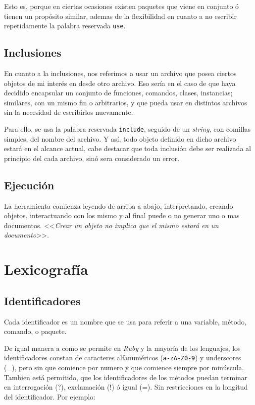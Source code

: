 \documentclass[12pt,letterpaper,titlepage,oneside,openright]{book}
\newcommand{\OhTeX}{%
    \makebox[0.76em][c]{O}%
    \makebox[0.25em][c]{%
        \raisebox{0.14em}[0em][0em]{%
            \fontsize{0.5em}{0cm}%
                \selectfont H%
        }%
    }%
    \makebox[1.35em][c]{\TeX}%
}
\newcommand{\ohtex}{\OhTeX\xspace}
\newcommand{\ruby}{\textit{Ruby}\xspace}
\begin{document}
Esto es, porque en ciertas ocasiones existen paquetes que viene en conjunto ó
tienen un propósito similar, ademas de la flexibilidad en cuanto a no escribir
repetidamente la palabra reservada \texttt{use}.

\subsection{Inclusiones}

En cuanto a la inclusiones, nos referimos a usar un archivo \ohtex que posea ciertos objetos de mi interés en desde otro archivo. Eso sería en el caso de que haya decidido encapsular un conjunto de funciones, comandos, clases, instancias; similares, con un mismo fin o arbitrarios, y que pueda usar en distintos archivos sin la necesidad de escribirlos nuevamente.

Para ello, se usa la palabra reservada \texttt{include}, seguido de un \textit{string}, con comillas simples, del nombre del archivo. Y así, todo objeto definido en dicho archivo estará en el alcance actual, cabe destacar que toda inclusión debe ser realizada al principio del cada archivo, sinó sera considerado un error.

\subsection{Ejecución}

La herramienta comienza leyendo de arriba a abajo, interpretando, creando
objetos, interactuando con los mismo y al final puede o no generar uno o mas
documentos. <<\textit{Crear un objeto no implica que el mismo estará en un
documento}>>.

\section{Lexicografía}

\subsection{Identificadores}

Cada identificador es un nombre que se usa para referir a una variable, método,
comando, o paquete. 

De igual manera a como se permite en \ruby y la mayoría de los lenguajes, los
identificadores constan de caracteres alfanuméricos (\verb|a-zA-Z0-9|) y
underscores (\_), pero sin que comience por numero y que comience siempre por
minúscula. Tambien está permitido, que los identificadores de los métodos puedan
terminar en interrogación (?), exclamación (!) ó igual (=). Sin restricciones
en la longitud del identificador. Por ejemplo:
\end{document}
